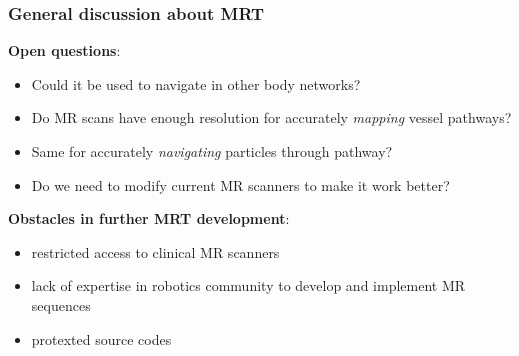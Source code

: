 \documentclass[8pt,xcolor=table]{beamer}
\begin{document}
\begin{frame}
\frametitle{General discussion about MRT}

\textbf{Open questions}:
\begin{itemize}
\item Could it be used to navigate in other body networks?
\item Do MR scans have enough resolution for accurately \emph{mapping} vessel pathways?
\item Same for accurately \emph{navigating} particles through pathway?
\item Do we need to modify current MR scanners to make it work better?
\end{itemize}

\vfill

\textbf{Obstacles in further MRT development}:
\begin{itemize}
 \item restricted access to clinical MR scanners
 \item lack of expertise in robotics community to develop and implement MR sequences
 \item protexted source codes
\end{itemize}




\end{frame}
\end{document}
